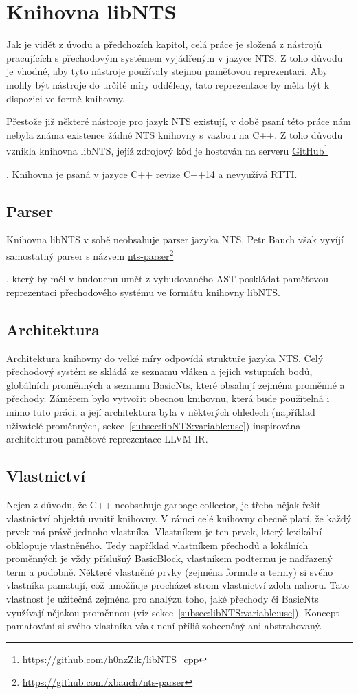 \documentclass{fithesis2}
\newcommand\fnurl[2]{%
  \href{#2}{#1}\footnote{\url{#2}}%
}
\begin{document}
\section{Knihovna libNTS}
Jak je vidět z úvodu a předchozích kapitol, celá práce je složená z nástrojů pracujících s přechodovým systémem vyjádřeným v jazyce NTS. Z toho důvodu je vhodné, aby tyto nástroje používaly stejnou paměťovou reprezentaci. Aby mohly být nástroje do určité míry odděleny, tato reprezentace by měla být k dispozici ve formě knihovny.

Přestože již některé nástroje pro jazyk NTS existují, v době psaní této práce nám nebyla známa existence žádné NTS knihovny s vazbou na C++. Z toho důvodu vznikla knihovna libNTS, jejíž zdrojový kód je hostován na serveru
\fnurl{GitHub}{https://github.com/h0nzZik/libNTS_cpp}
. Knihovna je psaná v jazyce C++ revize C++14 a nevyužívá RTTI.

\subsection{Parser}
Knihovna libNTS v sobě neobsahuje parser jazyka NTS. Petr Bauch však vyvíjí samostatný parser s názvem
\fnurl{nts-parser}{https://github.com/xbauch/nts-parser}
, který by měl v budoucnu umět z vybudovaného AST poskládat paměťovou reprezentaci přechodového systému ve formátu knihovny libNTS.

\subsection{Architektura}
Architektura knihovny do velké míry odpovídá struktuře jazyka NTS. Celý přechodový systém se skládá ze seznamu vláken a jejich vstupních bodů, globálních proměnných a seznamu BasicNts, které obsahují zejména proměnné a přechody. Záměrem bylo vytvořit obecnou knihovnu, která bude použitelná i mimo tuto práci, a její architektura byla v některých ohledech (například uživatelé proměnných, sekce~\ref{subsec:libNTS:variable:use}) inspirována architekturou paměťové reprezentace LLVM IR.

\subsection{Vlastnictví}
\label{subsec:libNTS:ownership}
Nejen z důvodu, že C++ neobsahuje garbage collector, je třeba nějak řešit vlastnictví objektů uvnitř knihovny. V rámci celé knihovny obecně platí, že každý prvek má právě jednoho vlastníka. Vlastníkem je ten prvek, který lexikální obklopuje vlastněného. Tedy například vlastníkem přechodů a lokálních proměnných je vždy příslušný BasicBlock, vlastníkem podtermu je nadřazený term a podobně. Některé vlastněné prvky (zejména formule a termy) si svého vlastníka pamatují, což umožňuje procházet strom vlastnictví zdola nahoru. Tato vlastnost je užitečná zejména pro analýzu toho, jaké přechody či BasicNts využívají nějakou proměnnou (viz sekce~\ref{subsec:libNTS:variable:use}). Koncept pamatování si svého vlastníka však není příliš zobecněný ani abstrahovaný.
\end{document}
